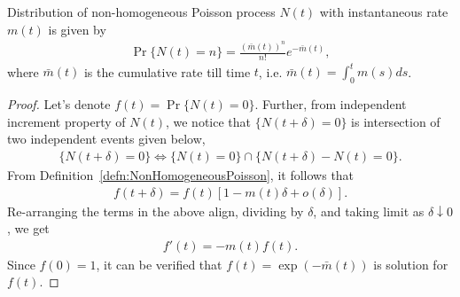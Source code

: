 \documentclass[a4paper,english,12pt]{article}
\begin{document}
\begin{prop} Distribution of non-homogeneous Poisson process $N(t)$ with instantaneous rate $m(t)$ is given by
	\begin{align*}
		\Pr\{N(t)=n\}=\frac{(\bar{m}(t))^n}{n!}e^{-\bar{m}(t)},
	\end{align*}
	where $\bar{m}(t)$ is the cumulative rate till time $t$, i.e. $\bar{m}(t)=\int_{0}^{t}m(s)ds$. 
\end{prop}
\begin{proof}
	Let's denote $f(t) = \Pr\{N(t)=0\}$. Further, from independent increment property of $N(t)$, we notice that $\{N(t+\delta) = 0\}$ is intersection of two independent events given below, 
	\begin{align*}
		\{N(t+\delta)=0\} \iff \{N(t)=0\}\cap\{N(t+\delta)-N(t)=0\}.
	\end{align*}
	From Definition~\ref{defn:NonHomogeneousPoisson}, it follows that
	\begin{align*}
		f(t+\delta) = f(t)[1 - m(t)\delta + o(\delta)].
	\end{align*}
	Re-arranging the terms in the above align, dividing by $\delta$, and taking limit as $\delta \downarrow 0$, we get 
	\begin{align*}
		f'(t) = -m(t)f(t).
	\end{align*}
	Since $f(0) = 1$, it can be verified that $f(t) = \exp(-\bar{m}(t))$ is solution for $f(t)$.

\end{proof}
\end{document}
